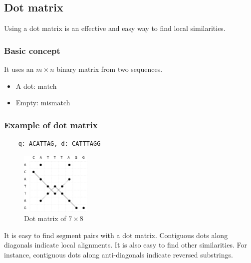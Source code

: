 %
%

%
%
\subsection{Dot matrix}
Using a dot matrix is an effective and easy way to find local similarities.

%
%
\subsubsection*{Basic concept}
It uses an $m \times n$ binary matrix from two sequences.

\begin{itemize}
\item A dot: match
\item Empty: mismatch
\end{itemize}

%
%
\subsubsection*{Example of dot matrix}
\begin{verbatim}
    q: ACATTAG, d: CATTTAGG
\end{verbatim}

\begin{figure}[H]
  \centering
      \includegraphics[width=0.3\textwidth]{fig04/dot_matrix.png}
  \caption{Dot matrix of $7 \times 8$}
\end{figure}

\noindent
It is easy to find segment pairs with a dot matrix. Contiguous dots along diagonals indicate local alignments. It is also easy to find other similarities. For instance, contiguous dots along anti-diagonals indicate reversed substrings.

%
%
